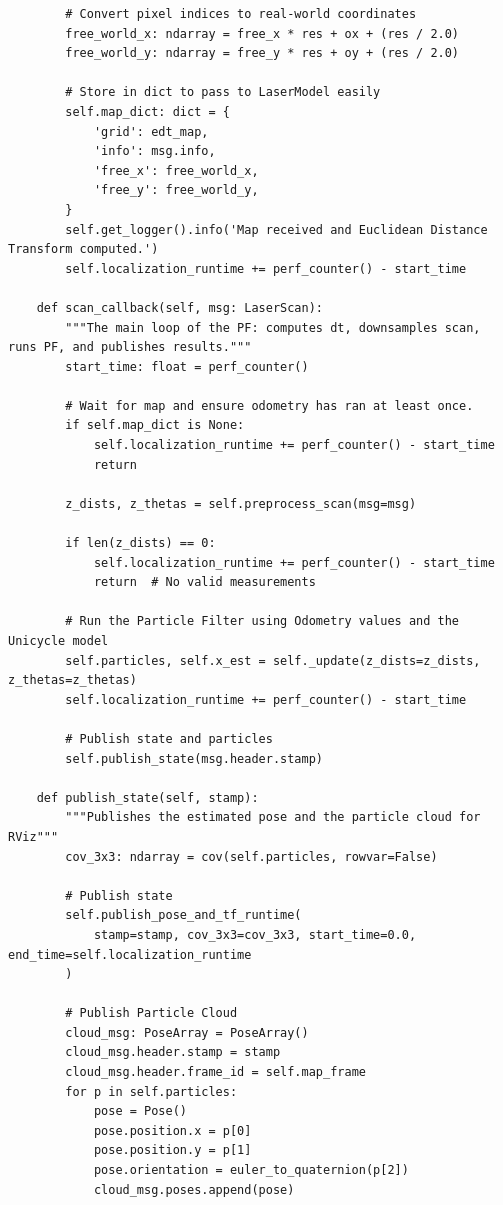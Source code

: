 \begin{verbatim}
        # Convert pixel indices to real-world coordinates
        free_world_x: ndarray = free_x * res + ox + (res / 2.0)
        free_world_y: ndarray = free_y * res + oy + (res / 2.0)

        # Store in dict to pass to LaserModel easily
        self.map_dict: dict = {
            'grid': edt_map,
            'info': msg.info,
            'free_x': free_world_x,
            'free_y': free_world_y,
        }
        self.get_logger().info('Map received and Euclidean Distance Transform computed.')
        self.localization_runtime += perf_counter() - start_time

    def scan_callback(self, msg: LaserScan):
        """The main loop of the PF: computes dt, downsamples scan, runs PF, and publishes results."""
        start_time: float = perf_counter()

        # Wait for map and ensure odometry has ran at least once.
        if self.map_dict is None:
            self.localization_runtime += perf_counter() - start_time
            return

        z_dists, z_thetas = self.preprocess_scan(msg=msg)

        if len(z_dists) == 0:
            self.localization_runtime += perf_counter() - start_time
            return  # No valid measurements

        # Run the Particle Filter using Odometry values and the Unicycle model
        self.particles, self.x_est = self._update(z_dists=z_dists, z_thetas=z_thetas)
        self.localization_runtime += perf_counter() - start_time

        # Publish state and particles
        self.publish_state(msg.header.stamp)

    def publish_state(self, stamp):
        """Publishes the estimated pose and the particle cloud for RViz"""
        cov_3x3: ndarray = cov(self.particles, rowvar=False)

        # Publish state
        self.publish_pose_and_tf_runtime(
            stamp=stamp, cov_3x3=cov_3x3, start_time=0.0, end_time=self.localization_runtime
        )

        # Publish Particle Cloud
        cloud_msg: PoseArray = PoseArray()
        cloud_msg.header.stamp = stamp
        cloud_msg.header.frame_id = self.map_frame
        for p in self.particles:
            pose = Pose()
            pose.position.x = p[0]
            pose.position.y = p[1]
            pose.orientation = euler_to_quaternion(p[2])
            cloud_msg.poses.append(pose)


\end{verbatim}
